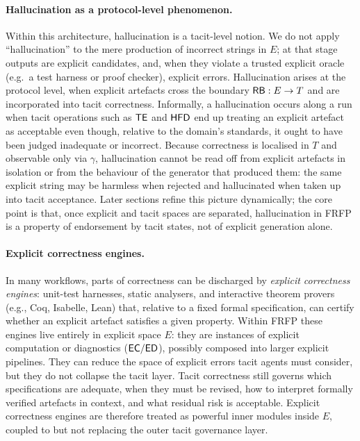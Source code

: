 \paragraph{Hallucination as a protocol-level phenomenon.}
Within this architecture, hallucination is a tacit-level notion. We do not apply ``hallucination'' to the mere production of incorrect strings in \(E\); at that stage outputs are explicit candidates, and, when they violate a trusted explicit oracle (e.g.\ a test harness or proof checker), explicit errors. Hallucination arises at the protocol level, when explicit artefacts cross the boundary \(\mathsf{RB}:E\to T\) and are incorporated into tacit correctness. Informally, a hallucination occurs along a run when tacit operations such as \(\mathsf{TE}\) and \(\mathsf{HFD}\) end up treating an explicit artefact as acceptable even though, relative to the domain's standards, it ought to have been judged inadequate or incorrect. Because correctness is localised in \(T\) and observable only via \(\gamma\), hallucination cannot be read off from explicit artefacts in isolation or from the behaviour of the generator that produced them: the same explicit string may be harmless when rejected and hallucinated when taken up into tacit acceptance. Later sections refine this picture dynamically; the core point is that, once explicit and tacit spaces are separated, hallucination in FRFP is a property of endorsement by tacit states, not of explicit generation alone.

\paragraph{Explicit correctness engines.}
In many workflows, parts of correctness can be discharged by \emph{explicit correctness engines}: unit-test harnesses, static analysers, and interactive theorem provers (e.g., Coq, Isabelle, Lean) that, relative to a fixed formal specification, can certify whether an explicit artefact satisfies a given property. Within FRFP these engines live entirely in explicit space \(E\): they are instances of explicit computation or diagnostics (\(\mathsf{EC}/\mathsf{ED}\)), possibly composed into larger explicit pipelines. They can reduce the space of explicit errors tacit agents must consider, but they do not collapse the tacit layer. Tacit correctness still governs which specifications are adequate, when they must be revised, how to interpret formally verified artefacts in context, and what residual risk is acceptable. Explicit correctness engines are therefore treated as powerful inner modules inside \(E\), coupled to but not replacing the outer tacit governance layer.

